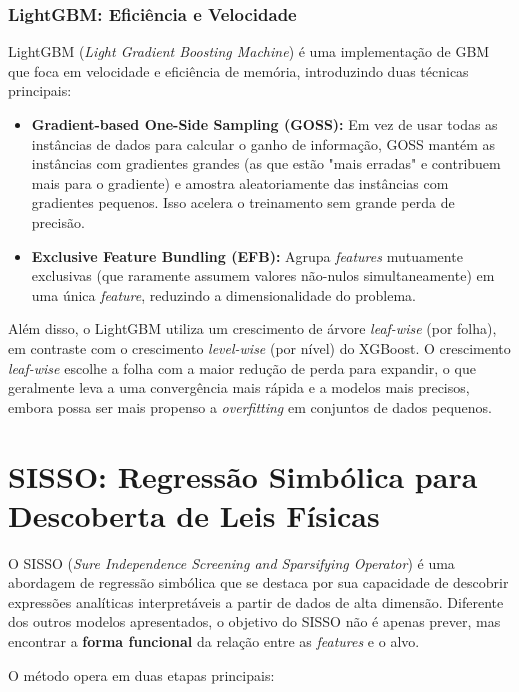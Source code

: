 \documentclass[12pt, a4paper, oneside]{report}
\begin{document}
\subsubsection{LightGBM: Eficiência e Velocidade}

LightGBM (\textit{Light Gradient Boosting Machine}) \cite{ke2017} é uma implementação de GBM que foca em velocidade e eficiência de memória, introduzindo duas técnicas principais:

\begin{itemize}
    \item \textbf{Gradient-based One-Side Sampling (GOSS):} Em vez de usar todas as instâncias de dados para calcular o ganho de informação, GOSS mantém as instâncias com gradientes grandes (as que estão "mais erradas" e contribuem mais para o gradiente) e amostra aleatoriamente das instâncias com gradientes pequenos. Isso acelera o treinamento sem grande perda de precisão.
    \item \textbf{Exclusive Feature Bundling (EFB):} Agrupa \textit{features} mutuamente exclusivas (que raramente assumem valores não-nulos simultaneamente) em uma única \textit{feature}, reduzindo a dimensionalidade do problema.
\end{itemize}

Além disso, o LightGBM utiliza um crescimento de árvore \textit{leaf-wise} (por folha), em contraste com o crescimento \textit{level-wise} (por nível) do XGBoost. O crescimento \textit{leaf-wise} escolhe a folha com a maior redução de perda para expandir, o que geralmente leva a uma convergência mais rápida e a modelos mais precisos, embora possa ser mais propenso a \textit{overfitting} em conjuntos de dados pequenos.

\section{SISSO: Regressão Simbólica para Descoberta de Leis Físicas}
\label{sec:sisso}

O SISSO (\textit{Sure Independence Screening and Sparsifying Operator}) \cite{ouyang2018} é uma abordagem de regressão simbólica que se destaca por sua capacidade de descobrir expressões analíticas interpretáveis a partir de dados de alta dimensão. Diferente dos outros modelos apresentados, o objetivo do SISSO não é apenas prever, mas encontrar a \textbf{forma funcional} da relação entre as \textit{features} e o alvo.

O método opera em duas etapas principais:
\end{document}
